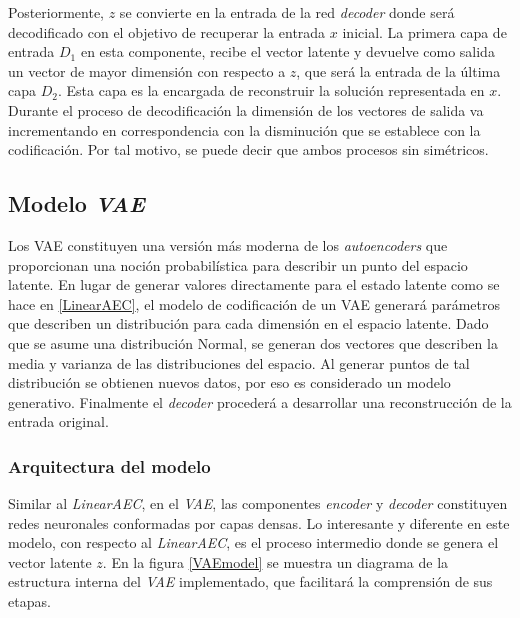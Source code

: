 Posteriormente, $z$ se convierte en la entrada de la red \textit{decoder} donde será decodificado con el objetivo de recuperar la entrada $x$ inicial. La primera capa de entrada $D_1$ en esta componente, recibe el vector latente y devuelve como salida un vector de mayor dimensión con respecto a $z$, que será la entrada de la última capa $D_2$. Esta capa es la encargada de reconstruir la solución representada en $x$. Durante el proceso de decodificación la dimensión de los vectores de salida va incrementando en correspondencia con la disminución que se establece con la codificación. Por tal motivo, se puede decir que ambos procesos sin simétricos.





\subsection{Modelo \textit{VAE}}
Los VAE constituyen una versión más moderna de los \textit{autoencoders} que proporcionan una noción probabilística para describir un punto del espacio latente. En lugar de generar valores directamente para el estado latente como se hace en \ref{LinearAEC}, el modelo de codificación de un VAE generará parámetros que describen un distribución para cada dimensión en el espacio latente. Dado que se asume una distribución Normal, se generan dos vectores que describen la media y varianza de las distribuciones del espacio. Al generar puntos de tal distribución se obtienen nuevos datos, por eso es considerado un modelo generativo. Finalmente el \textit{decoder} procederá a desarrollar una reconstrucción de la entrada original. 

\subsubsection{Arquitectura del modelo} 


Similar al \textit{LinearAEC}, en el \textit{VAE}, las componentes \textit{encoder} y \textit{decoder} constituyen redes neuronales conformadas por capas densas. Lo interesante y diferente en este modelo, con respecto al \textit{LinearAEC}, es el proceso intermedio donde se genera el vector latente $z$. En la figura \ref{VAEmodel} se muestra un diagrama de la estructura interna del \textit{VAE} implementado, que facilitará la comprensión de sus etapas.\\


